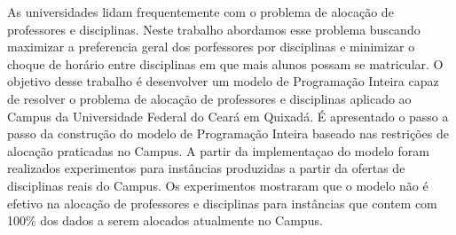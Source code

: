 As universidades lidam frequentemente com o problema de alocação de professores e disciplinas. Neste trabalho abordamos esse problema buscando maximizar a preferencia geral dos porfessores por disciplinas e minimizar o choque de horário entre disciplinas em que mais alunos possam se matricular. O objetivo desse trabalho é desenvolver um modelo de Programação Inteira capaz de resolver o problema de alocação de professores e disciplinas aplicado ao Campus da Universidade Federal do Ceará em Quixadá. É apresentado o passo a passo da construção do modelo de Programação Inteira baseado nas restrições de alocação praticadas no Campus. A partir da implementaçao do modelo foram realizados experimentos para instâncias produzidas a partir da ofertas de disciplinas reais do Campus. Os experimentos mostraram que o modelo não é efetivo na alocação de professores e disciplinas para instâncias que contem com 100\% dos dados a serem alocados atualmente no Campus.


